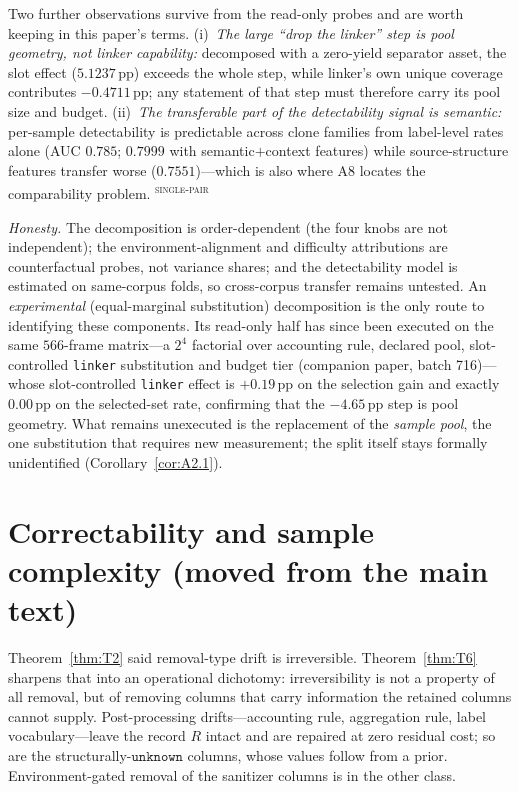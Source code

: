 \documentclass{article}
\newcommand{\unk}{\texttt{unknown}}
\newcommand{\pp}{\,\mathrm{pp}}
\newcommand{\evtag}[1]{\textsuperscript{\textsc{#1}}}
\begin{document}
Two further observations survive from the read-only probes and are worth keeping in this paper's terms.
(i)~\emph{The large ``drop the linker'' step is pool geometry, not linker capability:} decomposed with a
zero-yield separator asset, the slot effect ($5.1237\pp$) exceeds the whole step, while linker's own unique
coverage contributes $-0.4711\pp$; any statement of that step must therefore carry its pool size and budget.
(ii)~\emph{The transferable part of the detectability signal is semantic:} per-sample detectability is
predictable across clone families from label-level rates alone (AUC $0.785$; $0.7999$ with
semantic$+$context features) while source-structure features transfer worse ($0.7551$)---which is also where
A8 locates the comparability problem.
\evtag{single-pair}

\emph{Honesty.} The decomposition is order-dependent (the four knobs are not independent); the
environment-alignment and difficulty attributions are counterfactual probes, not variance shares; and the
detectability model is estimated on same-corpus folds, so cross-corpus transfer remains untested.
An \emph{experimental} (equal-marginal substitution) decomposition is the only route to identifying these
components. Its read-only half has since been executed on the same $566$-frame matrix---a $2^4$ factorial
over accounting rule, declared pool, slot-controlled \texttt{linker} substitution and budget tier (companion
paper, batch 716)---whose slot-controlled \texttt{linker} effect is $+0.19\pp$ on the selection gain and
exactly $0.00\pp$ on the selected-set rate, confirming that the $-4.65\pp$ step is pool geometry. What
remains unexecuted is the replacement of the \emph{sample pool}, the one substitution that requires new
measurement; the split itself stays formally unidentified (Corollary~\ref{cor:A2.1}).

\section{Correctability and sample complexity (moved from the main text)}
\label{app:corr_sample}
\label{sec:correct}

Theorem~\ref{thm:T2} said removal-type drift is irreversible. Theorem~\ref{thm:T6} sharpens that into an
operational dichotomy: irreversibility is not a property of all removal, but of removing columns that carry
information the retained columns cannot supply. Post-processing drifts---accounting rule, aggregation rule,
label vocabulary---leave the record $R$ intact and are repaired at zero residual cost; so are the
structurally-$\unk$ columns, whose values follow from a prior. Environment-gated removal of the sanitizer
columns is in the other class.
\end{document}
